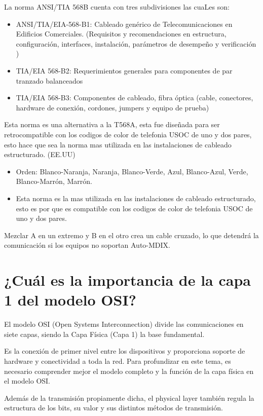 \documentclass[a4paper,12pt]{article}
\begin{document}
\begin{enumerate}
    La norma ANSI/TIA 568B cuenta con tres subdivisiones las cuaLes son:
    \begin{itemize}
        \item ANSI/TIA/EIA-568-B1: Cableado genérico de Telecomunicaciones en Edificios Comerciales. (Requisitos y recomendaciones en estructura, configuración, interfaces, instalación, parámetros de desempeño y verificación )
        \item TIA/EIA 568-B2: Requerimientos generales para componentes de par tranzado balanceados
        \item TIA/EIA 568-B3: Componentes de cableado, fibra óptica (cable, conectores, hardware de conexión, cordones, jumpers y equipo de prueba)
    \end{itemize}
    Esta norma es una alternativa a la T568A, esta fue diseñada para ser retrocompatible con los codigos de color de telefonia USOC de uno y dos pares, esto hace que sea la norma mas utilizada en las instalaciones de cableado estructurado. (EE.UU)
    \begin{itemize}
        \item Orden: Blanco-Naranja, Naranja, Blanco-Verde, Azul, Blanco-Azul, Verde, Blanco-Marrón, Marrón.
        \item Esta norma es la mas utilizada en las instalaciones de cableado estructurado, esto es por que es compatible con los codigos de color de telefonia USOC de uno y dos pares.
    \end{itemize}
    Mezclar A en un extremo y B en el otro crea un cable cruzado, lo que detendrá la comunicación si los equipos no soportan Auto-MDIX.

\end{enumerate}
\newpage
\section{¿Cuál es la importancia de la capa 1 del modelo OSI?}


El modelo OSI (Open Systems Interconnection) divide las comunicaciones en siete capas, siendo la Capa Física (Capa 1) la base fundamental.

Es la conexión de primer nivel entre los dispositivos y proporciona soporte de hardware y conectividad a toda la red. Para profundizar en este tema, es necesario comprender mejor el modelo completo y la función de la capa física en el modelo OSI.

Además de la transmisión propiamente dicha, el physical layer también regula la estructura de los bits, su valor y sus distintos métodos de transmisión.
\end{document}

